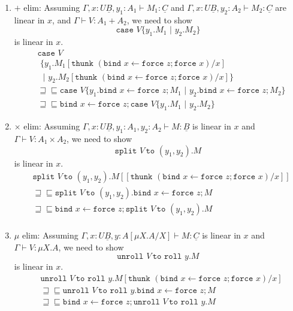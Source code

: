 \documentclass[acmsmall,screen,12pt]{acmart}
\renewcommand{\u}{\underline}
\newcommand{\pipe}{\,\,|\,\,}
\newcommand{\ltdyn}{\sqsubseteq}
\newcommand{\gtdyn}{\sqsupseteq}
\newcommand{\equidyn}{\mathrel{\gtdyn\ltdyn}}
\newcommand{\roll}{\kw{roll}}
\newcommand{\bindXtoYinZ}[2]{\kw{bind}#2 \leftarrow #1;}
\newcommand{\case}{\kw{case}}
\newcommand{\kw}[1]{\texttt{#1}\,\,}
\newcommand{\caseofXthenYelseZ}[3]{\case #1 \{ #2 \pipe #3 \}}
\newcommand{\caseofX}[1]{\case #1}
\newcommand{\thenY}{\{}
\newcommand{\elseZ}[1]{\pipe #1 \}}
\newcommand{\pmpairWtoXYinZ}[4]{\kw{split} #1\,\kw{to} (#2,#3). #4}
\newcommand{\pmmuXtoYinZ}[3]{\kw{unroll} #1 \,\kw{to} \roll #2. #3}
\newcommand{\thunk}{\kw{thunk}}
\newcommand{\force}{\kw{force}}
\begin{document}
{\begin{longonly}
\begin{longproof}
\begin{enumerate}
  \item $+$ elim: Assuming $\Gamma, x : U\u B, y_1 : A_1 \vdash M_1 :
    \u C$ and $\Gamma, x : U\u B, y_2: A_2\vdash M_2 : \u C$ are
    linear in $x$, and $\Gamma \vdash V : A_1 + A_2$, we need to show
    \[ \caseofXthenYelseZ V {y_1. M_1} {y_2. M_2} \]
    is linear in $x$.
    \begin{align*}
      & \caseofX V\\
      & \,\,\thenY {y_1. M_1[\thunk{(\bindXtoYinZ {\force z} x \force x)}/x]}\\
      & \,\,\elseZ {y_2. M_2[\thunk{(\bindXtoYinZ {\force z} x \force x)}/x]}\\
      &\equidyn \caseofXthenYelseZ V {y_1. \bindXtoYinZ {\force z} x M_1}{y_2. \bindXtoYinZ {\force z} x M_2}\tag{$M_1,M_2$ linear}\\
      &\equidyn
       \bindXtoYinZ {\force z} x \caseofXthenYelseZ V {y_1. M_1}{y_2. M_2}
    \end{align*}
  \item $\times$ elim: Assuming $\Gamma, x:U\u B, y_1 : A_1, y_2 : A_2
    \vdash M : \u B$ is linear in $x$ and $\Gamma \vdash V : A_1
    \times A_2$, we need to show
    \[ \pmpairWtoXYinZ V {y_1}{y_2} M \]
    is linear in $x$.
    \begin{align*}
      &\pmpairWtoXYinZ V {y_1}{y_2} M[[\thunk{(\bindXtoYinZ {\force z} x \force x)}/x]]\\
      &\equidyn \pmpairWtoXYinZ V {y_1}{y_2} \bindXtoYinZ {\force z} x M\tag{$M$ linear}\\
      &\equidyn  \bindXtoYinZ {\force z} x\pmpairWtoXYinZ V {y_1}{y_2} M\tag{comm. conv}\\
    \end{align*}
  \item $\mu$ elim: Assuming $\Gamma , x : U \u B, y : A[\mu X.A/X]
    \vdash M : \u C$ is linear in $x$ and $\Gamma \vdash V : \mu X.A$,
    we need to show
    \[ \pmmuXtoYinZ V y M \]
    is linear in $x$.
    \begin{align*}
      & \pmmuXtoYinZ V y M[\thunk{(\bindXtoYinZ {\force z} x \force x)}/x]\\
      & \equidyn \pmmuXtoYinZ V y \bindXtoYinZ {\force z} x M\tag{$M$ linear}\\
      &\equidyn  \bindXtoYinZ {\force z} x\pmmuXtoYinZ V y M \tag{commuting conversion}
    \end{align*}
  \end{enumerate}
\end{longproof}


\end{longonly}}
\end{document}
